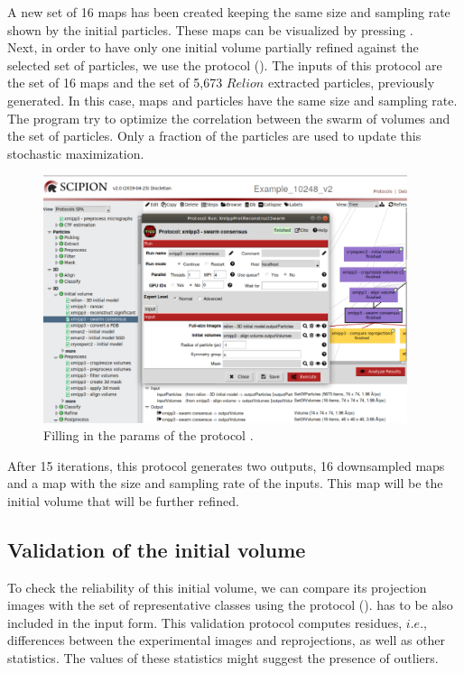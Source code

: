 A new set of 16 maps has been created keeping the same size and sampling rate shown by the initial particles. These maps can be visualized by pressing .\\

Next, in order to have only one initial volume partially refined against the selected set of particles, we use the protocol  (). The inputs of this protocol are the set of 16 maps and the set of 5,673 $Relion$ extracted particles, previously generated. In this case, maps and particles have the same size and sampling rate. The program try to optimize the correlation between the swarm of volumes and the set of particles. Only a fraction of the particles are used to update this stochastic maximization.

\begin{figure}[H]
  \centering
  \captionsetup{width=.8\linewidth} 
  \includegraphics[width=0.95\textwidth]
  {images/swarn_consensus.pdf}
  \caption{Filling in the params of the protocol .}
  \label{fig:swarn_consensus}
  \end{figure}
  
After 15 iterations, this protocol generates two outputs, 16 downsampled maps and a map with the size and sampling rate of the inputs. This map will be the initial volume that will be further refined.\\

\subsection*{Validation of the initial volume}
To check the reliability of this initial volume, we can compare its projection images with the set of representative  classes using the protocol  ().  has to be also included in the input form. This  validation protocol computes residues, $i.e.$, differences between the experimental images and reprojections, as well as other statistics. The values of these statistics might suggest the presence of outliers.

